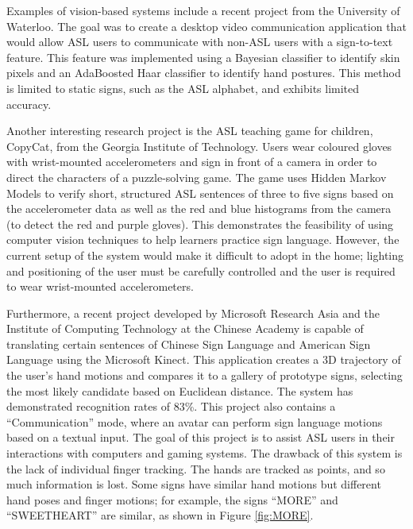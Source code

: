 \documentclass[12pt]{article}
\begin{document}
Examples of vision-based systems include a recent project from the University of Waterloo. The goal was to create a desktop video communication application that would allow ASL users to communicate with non-ASL users with a sign-to-text feature. This feature was implemented using a Bayesian classifier to identify skin pixels and an AdaBoosted Haar classifier to identify hand postures. This method is limited to static signs, such as the ASL alphabet, and exhibits limited accuracy.

Another interesting research project is the ASL teaching game for children, CopyCat, from the Georgia Institute of Technology. \cite{Zafrulla} Users wear coloured gloves with wrist-mounted accelerometers and sign in front of a camera in order to direct the characters of a puzzle-solving game. The game uses Hidden Markov Models to verify short, structured ASL sentences of three to five signs based on the accelerometer data as well as the red and blue histograms from the camera (to detect the red and purple gloves). This demonstrates the feasibility of using computer vision techniques to help learners practice sign language. However, the current setup of the system would make it difficult to adopt in the home; lighting and positioning of the user must be carefully controlled and the user is required to wear wrist-mounted accelerometers. 

Furthermore, a recent project developed by Microsoft Research Asia and the Institute of Computing Technology at the Chinese Academy is capable of translating certain sentences of Chinese Sign Language and American Sign Language using the Microsoft Kinect. \cite{Chai} This application creates a 3D trajectory of the user’s hand motions and compares it to a gallery of prototype signs, selecting the most likely candidate based on Euclidean distance. The system has demonstrated recognition rates of 83\%. This project also contains a “Communication” mode, where an avatar can perform sign language motions based on a textual input. The goal of this project is to assist ASL users in their interactions with computers and gaming systems. The drawback of this system is the lack of individual finger tracking. The hands are tracked as points, and so much information is lost. Some signs have similar hand motions but different hand poses and finger motions; for example, the signs “MORE” and “SWEETHEART” are similar, as shown in Figure \ref{fig:MORE}. 
\end{document}

